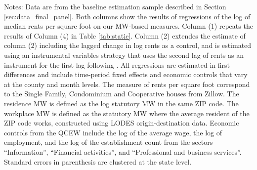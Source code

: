 \begin{table}[hbt!]
    \begin{minipage}{.95\textwidth} \footnotesize
        \vspace{2mm}
        Notes: 
        Data are from the baseline estimation sample described in Section 
        \ref{sec:data_final_panel}.
        Both columns show the results of regressions of the log of 
        median rents per square foot on our MW-based measures.
        Column (1) repeats the results of Column (4) in Table \ref{tab:static}.
        Column (2) extendes the estimate of column (2) including the lagged 
        change in log rents as a control, and is estimated using an 
        instrumental variables strategy that uses the second lag of rents
        as an instrument for the first lag following \textcite{ArellanoBond1991}.
        All regressions are estimated in first differences and include 
        time-period fixed effects and economic controls that vary at the 
        county and month levels.
        The measure of rents per square foot correspond to the Single Family, 
        Condominium and Cooperative houses from Zillow.
        The residence MW is defined as the log statutory MW in the same ZIP code.
        The workplace MW is defined as the statutory MW where the average 
        resident of the ZIP code works, constructed using LODES 
        origin-destination data.
        Economic controls from the QCEW include the log of the average wage, 
        the log of employment, and the log of the establishment count from the 
        sectors ``Information'', ``Financial activities'', and ``Professional
        and business services''.
        Standard errors in parenthesis are clustered at the state level.
    \end{minipage}
\end{table}

